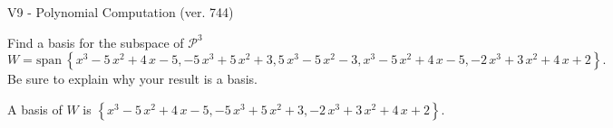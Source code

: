 \begin{exercise}
  \begin{exerciseTitle}V9 - Polynomial Computation (ver. 744)\end{exerciseTitle}
  \begin{exerciseStatement}
    Find a basis for the subspace of \(\mathcal{P}^3\) 
\[W=\mathrm{span}\ \left\{x^{3} - 5 \, x^{2} + 4 \, x - 5 , -5 \, x^{3} + 5 \, x^{2} + 3 , 5 \, x^{3} - 5 \, x^{2} - 3 , x^{3} - 5 \, x^{2} + 4 \, x - 5 , -2 \, x^{3} + 3 \, x^{2} + 4 \, x + 2\right\}.\]
 Be sure to explain why your result is a basis.


  \end{exerciseStatement}
  \begin{exerciseAnswer}
   A basis of \(W\) is  \(\left\{x^{3} - 5 \, x^{2} + 4 \, x - 5 , -5 \, x^{3} + 5 \, x^{2} + 3 , -2 \, x^{3} + 3 \, x^{2} + 4 \, x + 2\right\}\).
  


  \end{exerciseAnswer}
\end{exercise}